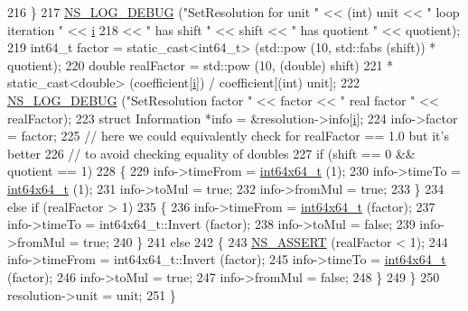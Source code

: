\begin{DoxyCode}
216         \}
217       \hyperlink{group__logging_ga413f1886406d49f59a6a0a89b77b4d0a}{NS\_LOG\_DEBUG} (\textcolor{stringliteral}{"SetResolution for unit "} << (\textcolor{keywordtype}{int}) unit << \textcolor{stringliteral}{" loop iteration "} << 
      \hyperlink{bernuolliDistribution_8m_a6f6ccfcf58b31cb6412107d9d5281426}{i}
218                     << \textcolor{stringliteral}{" has shift "} << shift << \textcolor{stringliteral}{" has quotient "} << quotient);
219       int64\_t factor = \textcolor{keyword}{static\_cast<}int64\_t\textcolor{keyword}{>} (std::pow (10, std::fabs (shift)) * quotient);
220       \textcolor{keywordtype}{double} realFactor = std::pow (10, (\textcolor{keywordtype}{double}) shift)
221                         * \textcolor{keyword}{static\_cast<}\textcolor{keywordtype}{double}\textcolor{keyword}{>} (coefficient[\hyperlink{bernuolliDistribution_8m_a6f6ccfcf58b31cb6412107d9d5281426}{i}]) / coefficient[(\textcolor{keywordtype}{int}) unit];
222       \hyperlink{group__logging_ga413f1886406d49f59a6a0a89b77b4d0a}{NS\_LOG\_DEBUG} (\textcolor{stringliteral}{"SetResolution factor "} << factor << \textcolor{stringliteral}{" real factor "} << realFactor);
223       \textcolor{keyword}{struct }Information *info = &resolution->info[\hyperlink{bernuolliDistribution_8m_a6f6ccfcf58b31cb6412107d9d5281426}{i}];
224       info->factor = factor;
225       \textcolor{comment}{// here we could equivalently check for realFactor == 1.0 but it's better}
226       \textcolor{comment}{// to avoid checking equality of doubles}
227       \textcolor{keywordflow}{if} (shift == 0 && quotient == 1)
228         \{
229           info->timeFrom = \hyperlink{classint64x64__t}{int64x64\_t} (1);
230           info->timeTo = \hyperlink{classint64x64__t}{int64x64\_t} (1);
231           info->toMul = \textcolor{keyword}{true};
232           info->fromMul = \textcolor{keyword}{true};
233         \}
234       \textcolor{keywordflow}{else} \textcolor{keywordflow}{if} (realFactor > 1)
235         \{
236           info->timeFrom = \hyperlink{classint64x64__t}{int64x64\_t} (factor);
237           info->timeTo = int64x64\_t::Invert (factor);
238           info->toMul = \textcolor{keyword}{false};
239           info->fromMul = \textcolor{keyword}{true};
240         \}
241       \textcolor{keywordflow}{else}
242         \{
243           \hyperlink{assert_8h_a6dccdb0de9b252f60088ce281c49d052}{NS\_ASSERT} (realFactor < 1);
244           info->timeFrom = int64x64\_t::Invert (factor);
245           info->timeTo = \hyperlink{classint64x64__t}{int64x64\_t} (factor);
246           info->toMul = \textcolor{keyword}{true};
247           info->fromMul = \textcolor{keyword}{false};
248         \}
249     \}
250   resolution->unit = unit;
251 \}
\end{DoxyCode}


